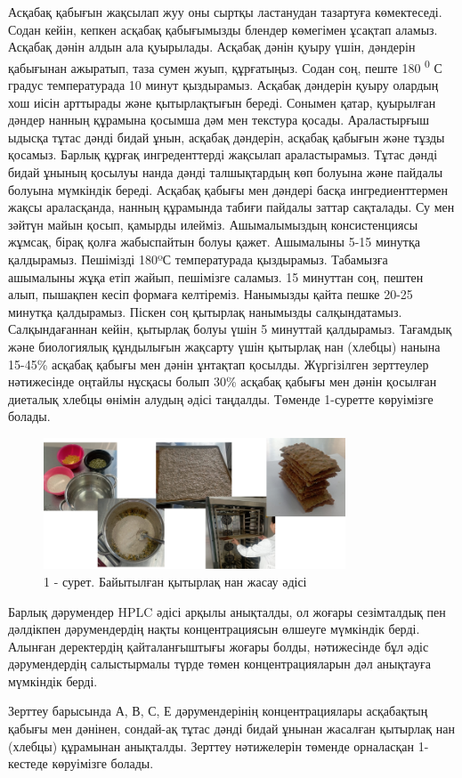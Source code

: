 \begin{multicols}{2}
Асқабақ қабығын жақсылап жуу оны сыртқы ластанудан тазартуға
көмектеседі. Содан кейін, кепкен асқабақ қабығымызды блендер көмегімен
ұсақтап аламыз. Асқабақ дәнін алдын ала қуырылады. Асқабақ дәнін қуыру
үшін, дәндерін қабығынан ажыратып, таза сумен жуып, құрғатыңыз. Содан
соң, пеште 180 \textsuperscript{0} С градус температурада 10 минут
қыздырамыз. Асқабақ дәндерін қуыру олардың хош иісін арттырады және
қытырлақтығын береді. Сонымен қатар, қуырылған дәндер нанның құрамына
қосымша дәм мен текстура қосады. Араластырғыш ыдысқа тұтас дәнді бидай
ұнын, асқабақ дәндерін, асқабақ қабығын және тұзды қосамыз. Барлық
құрғақ ингреденттерді жақсылап араластырамыз. Тұтас дәнді бидай ұнының
қосылуы нанда дәнді талшықтардың көп болуына және пайдалы болуына
мүмкіндік береді. Асқабақ қабығы мен дәндері басқа ингредиенттермен
жақсы араласқанда, нанның құрамында табиғи пайдалы заттар сақталады. Су
мен зәйтүн майын қосып, қамырды илейміз. Ашымалымыздың консистенциясы
жұмсақ, бірақ қолға жабыспайтын болуы қажет. Ашымалыны 5-15 минутқа
қалдырамыз. Пешімізді 180ºС температурада қыздырамыз. Табамызға
ашымалыны жұқа етіп жайып, пешімізге саламыз. 15 минуттан соң, пештен
алып, пышақпен кесіп формаға келтіреміз. Нанымызды қайта пешке 20-25
минутқа қалдырамыз. Піскен соң қытырлақ нанымызды салқындатамыз.
Салқындағаннан кейін, қытырлақ болуы үшін 5 минуттай қалдырамыз.
Тағамдық және биологиялық құндылығын жақсарту үшін қытырлақ нан (хлебцы)
нанына 15-45\% асқабақ қабығы мен дәнін ұнтақтап қосылды. Жүргізілген
зерттеулер нәтижесінде оңтайлы нұсқасы болып 30\% асқабақ қабығы мен
дәнін қосылған диеталық хлебцы өнімін алудың әдісі таңдалды. Төменде
1-суретте көруімізге болады.
\end{multicols}

\begin{figure}[H]
	\centering
	\includegraphics[width=0.8\textwidth]{media/pish2/image4}
	\caption*{1 - сурет. Байытылған қытырлақ нан жасау әдісі}
\end{figure}

\begin{multicols}{2}
Барлық дәрумендер HPLC әдісі арқылы анықталды, ол жоғары сезімталдық пен
дәлдікпен дәрумендердің нақты концентрациясын өлшеуге мүмкіндік берді.
Алынған деректердің қайталанғыштығы жоғары болды, нәтижесінде бұл әдіс
дәрумендердің салыстырмалы түрде төмен концентрацияларын дәл анықтауға
мүмкіндік берді.

Зерттеу барысында А, В, С, Е дәрумендерінің концентрациялары асқабақтың
қабығы мен дәнінен, сондай-ақ тұтас дәнді бидай ұнынан жасалған қытырлақ
нан (хлебцы) құрамынан анықталды. Зерттеу нәтижелерін төменде орналасқан
1-кестеде көруімізге болады.
\end{multicols}


